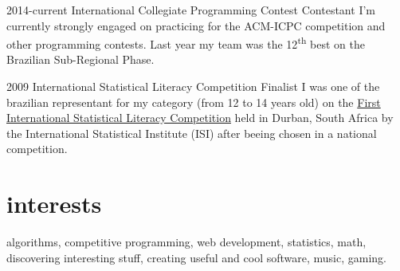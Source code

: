 \documentclass[]{friggeri-cv} %
\begin{document}
\begin{entrylist}


\entry
{2014-current}
{International Collegiate Programming Contest}
{Contestant}
{I'm currently strongly engaged on practicing for the ACM-ICPC competition and other programming contests. Last year my team was the 12\textsuperscript{th} best on the Brazilian Sub-Regional Phase.}

\entry
{2009}
{International Statistical Literacy Competition}
{Finalist}
{I was one of the brazilian representant for my category (from 12 to 14 years old) on the \href{http://iase-web.org/islp/Competitions.php?p=Competitions_2008-2009}{First International Statistical Literacy Competition} held in Durban, South Africa by the International Statistical Institute (ISI) after beeing chosen in a national competition.}


\end{entrylist}


\section{interests}

algorithms, competitive programming, web development, statistics, math, discovering interesting stuff, creating useful and cool software, music, gaming.
\end{document}
